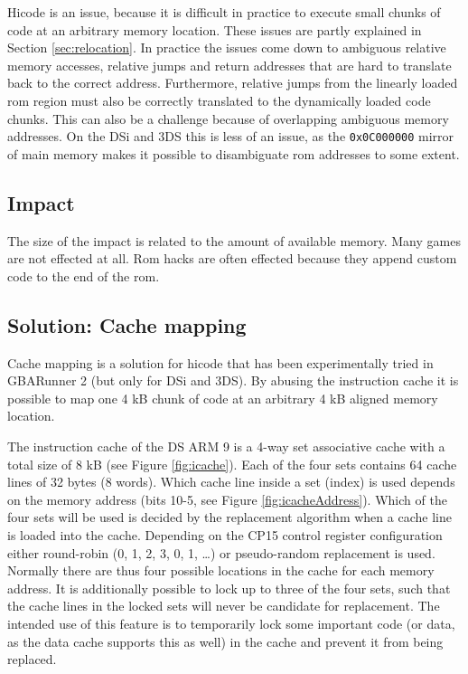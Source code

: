 \documentclass[a4paper,10pt]{report}
\begin{document}
	Hicode is an issue, because it is difficult in practice to execute small chunks of code at an arbitrary memory location. These issues are partly explained in Section \ref{sec:relocation}. In practice the issues come down to ambiguous relative memory accesses, relative jumps and return addresses that are hard to translate back to the correct address. Furthermore, relative jumps from the linearly loaded rom region 
	must also be correctly translated to the dynamically loaded code chunks. This can also be a challenge because of overlapping ambiguous memory addresses. On the DSi and 3DS this is less of an issue, as the \texttt{0x0C000000} mirror of main memory makes it possible to disambiguate rom addresses to some extent.
	
	\subsection{Impact}
	The size of the impact is related to the amount of available memory. Many games are not effected at all. Rom hacks are often effected because they append custom code to the end of the rom.
	
	\subsection{Solution: Cache mapping}
	Cache mapping is a solution for hicode that has been experimentally tried in GBARunner 2 (but only for DSi and 3DS). By abusing the instruction cache it is possible to map one 4 kB chunk of code at an arbitrary 4 kB aligned memory location.
	
	The instruction cache of the DS ARM 9 is a 4-way set associative cache with a total size of 8 kB (see Figure \ref{fig:icache}). Each of the four sets contains 64 cache lines of 32 bytes (8 words). Which cache line inside a set (index) is used depends on the memory address (bits 10-5, see Figure \ref{fig:icacheAddress}). Which of the four sets will be used is decided by the replacement algorithm when a cache line is loaded into the cache. Depending on the CP15 control register configuration either round-robin (0, 1, 2, 3, 0, 1, \dots) or pseudo-random replacement is used. Normally there are thus four possible locations in the cache for each memory address. It is additionally possible to lock up to three of the four sets, such that the cache lines in the locked sets will never be candidate for replacement. The intended use of this feature is to temporarily lock some important code (or data, as the data cache supports this as well) in the cache and prevent it from being replaced.
	
\end{document}
